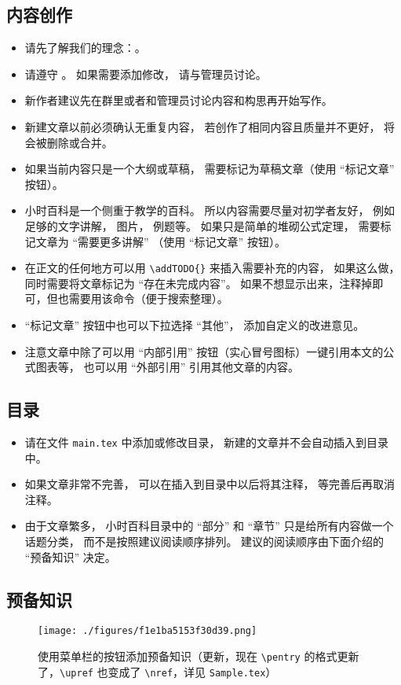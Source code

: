 
\subsection{内容创作}
\begin{itemize}
\item 请先了解我们的理念：。
\item 请遵守 。 如果需要添加修改， 请与管理员讨论。
\item 新作者建议先在群里或者和管理员讨论内容和构思再开始写作。
\item 新建文章以前必须确认无重复内容， 若创作了相同内容且质量并不更好， 将会被删除或合并。
\item 如果当前内容只是一个大纲或草稿， 需要标记为草稿文章（使用 “标记文章” 按钮）。
\item 小时百科是一个侧重于教学的百科。 所以内容需要尽量对初学者友好， 例如足够的文字讲解， 图片， 例题等。 如果只是简单的堆砌公式定理， 需要标记文章为 “需要更多讲解” （使用 “标记文章” 按钮）。
\item 在正文的任何地方可以用 \verb`\addTODO{}` 来插入需要补充的内容， 如果这么做， 同时需要将文章标记为 “存在未完成内容”。 如果不想显示出来，注释掉即可，但也需要用该命令（便于搜索整理）。
\item “标记文章” 按钮中也可以下拉选择 “其他”， 添加自定义的改进意见。
\item 注意文章中除了可以用 “内部引用” 按钮（实心冒号图标）一键引用本文的公式图表等， 也可以用 “外部引用” 引用其他文章的内容。
\end{itemize}

\subsection{目录}
\begin{itemize}
\item 请在文件 \verb`main.tex` 中添加或修改目录， 新建的文章并不会自动插入到目录中。
\item 如果文章非常不完善， 可以在插入到目录中以后将其注释， 等完善后再取消注释。
\item 由于文章繁多， 小时百科目录中的 “部分” 和 “章节” 只是给所有内容做一个话题分类， 而不是按照建议阅读顺序排列。 建议的阅读顺序由下面介绍的 “预备知识” 决定。
\end{itemize}

\subsection{预备知识}
\begin{figure}[ht]
\centering
\texttt{[image: ./figures/f1e1ba5153f30d39.png]}
\caption{使用菜单栏的按钮添加预备知识（更新，现在 \verb`\pentry` 的格式更新了，\verb`\upref` 也变成了 \verb`\nref`，详见 \verb`Sample.tex`）} \label{fig_WrGuid_1}
\end{figure}

